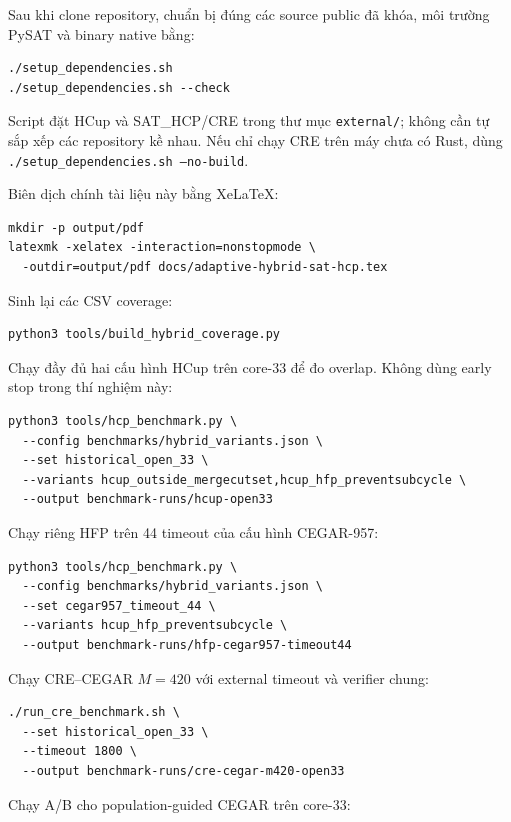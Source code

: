\documentclass[11pt,a4paper,oneside]{scrreprt}
\newcommand{\code}[1]{\texttt{#1}}
\begin{document}
Sau khi clone repository, chuẩn bị đúng các source public đã khóa, môi trường PySAT và binary native bằng:

\begin{verbatim}
./setup_dependencies.sh
./setup_dependencies.sh --check
\end{verbatim}

Script đặt HCup và SAT\_HCP/CRE trong thư mục \code{external/}; không cần tự sắp xếp các repository kề nhau. Nếu chỉ chạy CRE trên máy chưa có Rust, dùng \code{./setup\_dependencies.sh --no-build}.

Biên dịch chính tài liệu này bằng XeLaTeX:

\begin{verbatim}
mkdir -p output/pdf
latexmk -xelatex -interaction=nonstopmode \
  -outdir=output/pdf docs/adaptive-hybrid-sat-hcp.tex
\end{verbatim}

Sinh lại các CSV coverage:

\begin{verbatim}
python3 tools/build_hybrid_coverage.py
\end{verbatim}

Chạy đầy đủ hai cấu hình HCup trên core-33 để đo overlap. Không dùng early stop trong thí nghiệm này:

\begin{verbatim}
python3 tools/hcp_benchmark.py \
  --config benchmarks/hybrid_variants.json \
  --set historical_open_33 \
  --variants hcup_outside_mergecutset,hcup_hfp_preventsubcycle \
  --output benchmark-runs/hcup-open33
\end{verbatim}

Chạy riêng HFP trên 44 timeout của cấu hình CEGAR-957:

\begin{verbatim}
python3 tools/hcp_benchmark.py \
  --config benchmarks/hybrid_variants.json \
  --set cegar957_timeout_44 \
  --variants hcup_hfp_preventsubcycle \
  --output benchmark-runs/hfp-cegar957-timeout44
\end{verbatim}

Chạy CRE--CEGAR $M=420$ với external timeout và verifier chung:

\begin{verbatim}
./run_cre_benchmark.sh \
  --set historical_open_33 \
  --timeout 1800 \
  --output benchmark-runs/cre-cegar-m420-open33
\end{verbatim}

\newpage
Chạy A/B cho population-guided CEGAR trên core-33:
\end{document}

